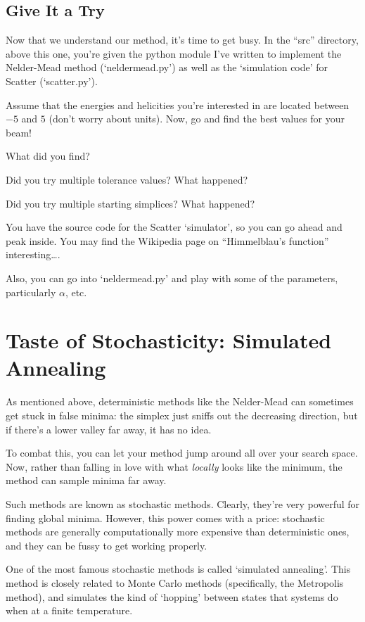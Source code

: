 \documentclass{article}
\begin{document}
	\subsection*{Give It a Try}
    Now that we understand our method, it's time to get busy.
    In the ``src'' directory, above this one, you're given the python
    module I've written to implement the Nelder-Mead method
    (`neldermead.py') as well as the `simulation code'
    for Scatter (`scatter.py').
    
    Assume that the energies and 
    helicities you're interested in are located between
    $-5$ and $5$ (don't worry about units). Now, go and
    find the best values for your beam!

    What did you find? 
    
    Did you try multiple tolerance values? What happened?
    
    Did you try multiple starting simplices?
    What happened? 

    You have the source code for the Scatter `simulator', so you
    can go ahead and peak inside. 
    You may find the Wikipedia page on ``Himmelblau's function'' interesting\dots.

    Also, you can go into `neldermead.py' and play with some of the 
    parameters, particularly $\alpha$, etc.

\section*{Taste of Stochasticity: Simulated Annealing}
  As mentioned above, deterministic methods like
  the Nelder-Mead can sometimes get stuck in false minima:
  the simplex just sniffs out the decreasing direction,
  but if there's a lower valley far away, it has no idea.

  To combat this, you can let your method jump around all over your search space.
  Now, rather than falling in love with what \emph{locally} looks like the 
  minimum, the method can sample minima far away.

  Such methods are known as stochastic methods. Clearly, they're very powerful
  for finding global minima. However, this power comes with a price:
  stochastic methods are generally computationally more expensive than
  deterministic ones, and they can be fussy to get working properly.

  One of the most famous stochastic methods is called 
  `simulated annealing'.
  This method is closely related to Monte Carlo methods 
  (specifically, the Metropolis method), and simulates the kind
  of `hopping' between states that systems do when at a finite 
  temperature.
  
\end{document}
